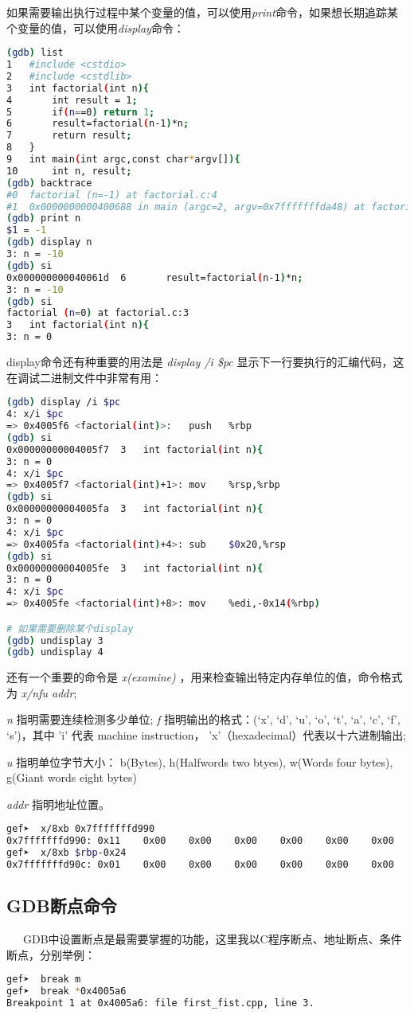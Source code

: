\documentclass[12pt]{article}  %
\begin{document}
如果需要输出执行过程中某个变量的值，可以使用\emph{print}命令，如果想长期追踪某个变量的值，可以使用\emph{display}命令：
\begin{lstlisting}[language=sh]
(gdb) list
1	#include <cstdio>
2	#include <cstdlib>
3	int factorial(int n){
4	    int result = 1;
5	    if(n==0) return 1;
6	    result=factorial(n-1)*n;
7	    return result;
8	}
9	int main(int argc,const char*argv[]){
10	    int n, result;
(gdb) backtrace
#0  factorial (n=-1) at factorial.c:4
#1  0x0000000000400688 in main (argc=2, argv=0x7fffffffda48) at factorial.c:16
(gdb) print n
$1 = -1
(gdb) display n
3: n = -10
(gdb) si
0x000000000040061d	6	    result=factorial(n-1)*n;
3: n = -10
(gdb) si
factorial (n=0) at factorial.c:3
3	int factorial(int n){
3: n = 0
\end{lstlisting}\par
display命令还有种重要的用法是 \emph{display /i \$pc} 显示下一行要执行的汇编代码，这在调试二进制文件中非常有用：
\begin{lstlisting}[language=sh]
(gdb) display /i $pc
4: x/i $pc
=> 0x4005f6 <factorial(int)>:	push   %rbp
(gdb) si
0x00000000004005f7	3	int factorial(int n){
3: n = 0
4: x/i $pc
=> 0x4005f7 <factorial(int)+1>:	mov    %rsp,%rbp
(gdb) si
0x00000000004005fa	3	int factorial(int n){
3: n = 0
4: x/i $pc
=> 0x4005fa <factorial(int)+4>:	sub    $0x20,%rsp
(gdb) si
0x00000000004005fe	3	int factorial(int n){
3: n = 0
4: x/i $pc
=> 0x4005fe <factorial(int)+8>:	mov    %edi,-0x14(%rbp)

# 如果需要删除某个display
(gdb) undisplay 3
(gdb) undisplay 4
\end{lstlisting}\par
还有一个重要的命令是 \emph{x(examine)} ，用来检查输出特定内存单位的值，命令格式为 \emph{x/nfu addr};\par
\emph{n} 指明需要连续检测多少单位;
\emph{f} 指明输出的格式：(‘x’, ‘d’, ‘u’, ‘o’, ‘t’, ‘a’, ‘c’, ‘f’, ‘s’)，其中 'i' 代表 machine instruction， 'x'（hexadecimal）代表以十六进制输出;\par
\emph{u} 指明单位字节大小： b(Bytes), h(Halfwords two btyes), w(Words four bytes), g(Giant words eight bytes)\par
\emph{addr} 指明地址位置。\par 
\begin{lstlisting}[language=sh]
gef➤  x/8xb 0x7fffffffd990
0x7fffffffd990:	0x11	0x00	0x00	0x00	0x00	0x00	0x00	0x00
gef➤  x/8xb $rbp-0x24 
0x7fffffffd90c:	0x01	0x00	0x00	0x00	0x00	0x00	0x00	0x00
\end{lstlisting}
\subsection{GDB断点命令}
\ \ \ GDB中设置断点是最需要掌握的功能，这里我以C程序断点、地址断点、条件断点，分别举例：
\begin{lstlisting}[language=sh]
gef➤  break m
gef➤  break *0x4005a6
Breakpoint 1 at 0x4005a6: file first_fist.cpp, line 3.

\end{lstlisting}
\end{document}
